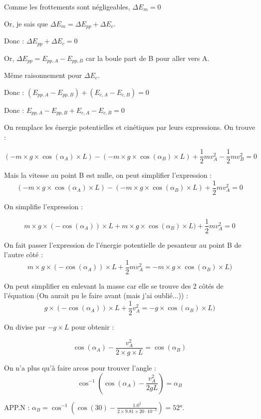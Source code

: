 \documentclass[a4paper,twoside,10pt,french]{scrartcl}
\begin{document}
Comme les frottements sont négligeables, $\Delta E_m = 0$

Or, je sais que $\Delta E_m = \Delta E_{pp} + \Delta E_c$.

Donc : $\Delta E_{pp} + \Delta E_c = 0$

Or, $\Delta E_{pp} = E_{pp, A} - E_{pp, B}$ car la boule part de B pour aller vers A.

Même raisonnement pour $\Delta E_c$.

Donc : $(E_{pp, A} - E_{pp, B}) + (E_{c, A} - E_{c, B}) = 0$

Donc : $E_{pp, A} - E_{pp, B} + E_{c, A} - E_{c, B} = 0$

On remplace les énergie potentielles et cinétiques par leurs expressions. On trouve :

$$( - m \times g \times \cos(\alpha_A) \times L) - ( - m \times g \times \cos(\alpha_B) \times L) + \frac{1}{2}mv_A^2 - \frac{1}{2}mv_B^2 = 0$$

Mais la vitesse au point B est nulle, on peut simplifier l'expression :
$$( - m \times g \times \cos(\alpha_A) \times L) - ( - m \times g \times \cos(\alpha_B) \times L) + \frac{1}{2}mv_A^2 = 0$$

On simplifie l'expression :

$$m \times g \times (-\cos(\alpha_A)) \times L + m \times g \times \cos(\alpha_B) \times L) + \frac{1}{2}mv_A^2 = 0$$


On fait passer l'expression de l'énergie potentielle de pesanteur au point B de l'autre côté :
$$m \times g \times (-\cos(\alpha_A)) \times L + \frac{1}{2}mv_A^2 = - m \times g \times \cos(\alpha_B) \times L) $$

On peut simplifier en enlevant la masse car elle se trouve des 2 côtés de l'équation (On aurait pu le faire avant (mais j'ai oublié...)) :
$$g \times (-\cos(\alpha_A)) \times L + \frac{1}{2}v_A^2 = - g \times \cos(\alpha_B) \times L) $$

On divise par $-g \times L$ pour obtenir :

$$\cos(\alpha_A) - \frac{v_A^2}{2 \times g \times L} = \cos(\alpha_B)$$

On n'a plus qu'à faire arcos pour trouver l'angle :
$$\cos^{-1}(\cos(\alpha_A) - \frac{v_A^2}{2gL}) = \alpha_B$$

APP.N : $\alpha_B = \cos^{-1}(\cos(30) - \frac{1.0^2}{2 \times 9.81 \times 20 \cdot10^{-2}}) = 52$°.
\end{document}
